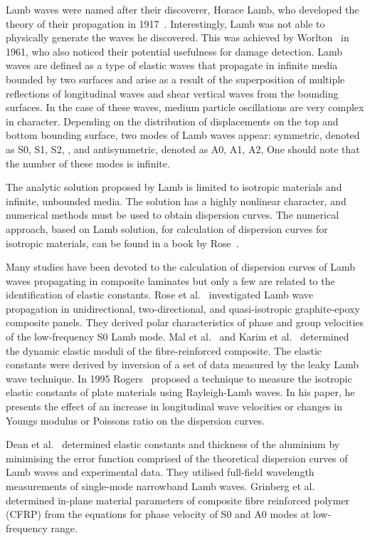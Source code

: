	Lamb waves were named after their discoverer, Horace Lamb, who developed the theory of their propagation in 1917~\cite{Lamb1917}. Interestingly, Lamb was not able to physically generate the waves he discovered. This was achieved by Worlton~\cite{Worlton1961} in 1961, who also noticed their potential usefulness for damage detection. Lamb waves are defined as a type of elastic waves that propagate in infinite media bounded by two surfaces and arise as a result of the superposition of multiple reflections of longitudinal waves and shear vertical waves from the bounding surfaces. In the case of these waves, medium particle oscillations are very complex in character. Depending on the distribution of displacements on the top and bottom bounding surface, two modes of Lamb waves appear: symmetric, denoted as S0, S1, S2, , and antisymmetric, denoted as A0, A1, A2,  One should note that the number of these modes is infinite.
	
	The analytic solution proposed by Lamb is limited to isotropic materials and infinite, unbounded media. The solution has a highly nonlinear character, and numerical methods must be used to obtain dispersion curves. The numerical approach, based on Lamb solution, for calculation of dispersion curves for isotropic materials, can be found in a book by Rose~\cite{Rose1999}.
	
	Many studies have been devoted to the calculation of dispersion curves of Lamb waves propagating in composite laminates but only a few are related to the identification of elastic constants. Rose et al.~\cite{Rose1987} investigated Lamb wave propagation in unidirectional, two-directional, and quasi-isotropic graphite-epoxy composite panels. They derived polar characteristics of phase and group velocities of the low-frequency S0 Lamb mode. Mal et al.~\cite{Mal1993} and Karim et al.~\cite{Karim1990} determined the dynamic elastic moduli of the fibre-reinforced composite. The elastic constants were derived by inversion of a set of data measured by the leaky Lamb wave technique. In 1995 Rogers~\cite{Rogers1995} proposed a technique to measure the isotropic elastic constants of plate materials using Rayleigh-Lamb waves. In his paper, he presents the effect of an increase in longitudinal wave velocities or changes in Youngs modulus or Poissons ratio on the dispersion curves.
	
	Dean et al.~\cite{Dean2008} determined elastic constants and thickness of the aluminium by minimising the error function comprised of the theoretical dispersion curves of Lamb waves and experimental data. They utilised full-field wavelength measurements of single-mode narrowband Lamb waves. Grinberg et al.~\cite{Grimberg2010} determined in-plane material parameters of composite fibre reinforced polymer (CFRP) from the equations for phase velocity of S0 and A0 modes at low-frequency range. 
	
